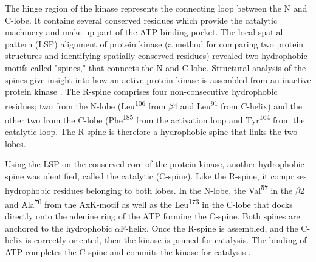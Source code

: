 \documentclass[a4paper, 11pt]{report}
\begin{document}
The hinge region of the kinase represents the connecting loop between the N and C-lobe. It contains several conserved residues which provide the catalytic machinery and make up part of the ATP binding pocket. The local spatial pattern (LSP) alignment of protein kinase (a method for comparing two protein structures and identifying spatially conserved residues) revealed two hydrophobic motifs called "spines," that connects the N and C-lobe. Structural analysis of the spines give insight into how an active protein kinase is assembled from an inactive protein kinase \cite{taylor2011protein}. The R-spine comprises four non-consecutive hydrophobic residues; two from the N-lobe (Leu\textsuperscript{106} from $\beta$4 and Leu\textsuperscript{91} from C-helix) and the other two from the C-lobe (Phe\textsuperscript{185} from the activation loop and Tyr\textsuperscript{164}  from the catalytic loop. The R spine is therefore a hydrophobic spine that links the two lobes.\par Using the LSP on the conserved core of the protein kinase, another hydrophobic spine was identified, called the catalytic (C-spine). Like the R-spine, it comprises hydrophobic residues belonging to both lobes. In the N-lobe, the Val\textsuperscript{57} in the $\beta$2 and Ala\textsuperscript{70} from the AxK-motif as well as the Leu\textsuperscript{173} in the C-lobe that docks directly onto the adenine ring of the ATP forming the C-spine. Both spines are anchored to the hydrophobic $\alpha$F-helix. Once the R-spine is assembled, and the C-helix is correctly oriented, then the kinase is primed for catalysis. The binding of ATP completes the C-spine and commits the kinase for catalysis \cite{taylor2011protein,fabbro2015ten,roskoski2016classification}.
\end{document}
